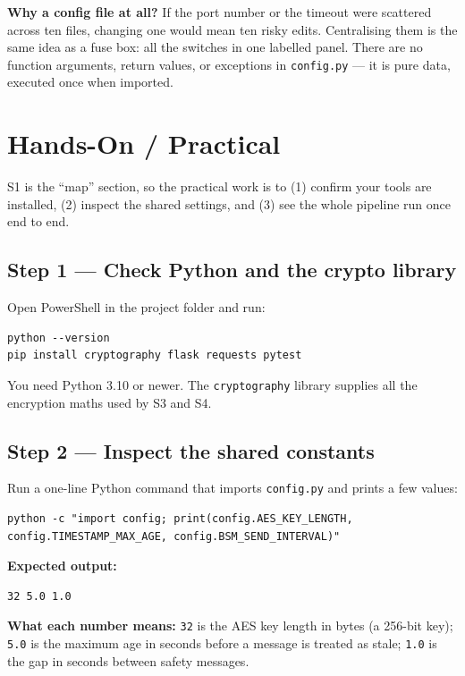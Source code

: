 \documentclass[11pt,a4paper]{report}
\begin{document}
\medskip
\noindent\textbf{Why a config file at all?} If the port number or the timeout
were scattered across ten files, changing one would mean ten risky edits.
Centralising them is the same idea as a fuse box: all the switches in one labelled
panel. There are no function arguments, return values, or exceptions in
\texttt{config.py} --- it is pure data, executed once when imported.

\section{Hands-On / Practical}

S1 is the ``map'' section, so the practical work is to (1) confirm your tools
are installed, (2) inspect the shared settings, and (3) see the whole pipeline
run once end to end.

\subsection{Step 1 --- Check Python and the crypto library}
Open PowerShell in the project folder and run:
\begin{lstlisting}[style=term]
python --version
pip install cryptography flask requests pytest
\end{lstlisting}
You need Python 3.10 or newer. The \texttt{cryptography} library supplies all
the encryption maths used by S3 and S4.

\subsection{Step 2 --- Inspect the shared constants}
Run a one-line Python command that imports \texttt{config.py} and prints a few
values:
\begin{lstlisting}[style=term]
python -c "import config; print(config.AES_KEY_LENGTH, config.TIMESTAMP_MAX_AGE, config.BSM_SEND_INTERVAL)"
\end{lstlisting}

\noindent\textbf{Expected output:}
\begin{lstlisting}[style=term]
32 5.0 1.0
\end{lstlisting}
\textbf{What each number means:} \texttt{32} is the AES key length in bytes (a
256-bit key); \texttt{5.0} is the maximum age in seconds before a message is
treated as stale; \texttt{1.0} is the gap in seconds between safety messages.
\end{document}
